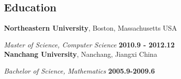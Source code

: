 \documentclass[margin,line]{res}
\begin{document}
\begin{resume}
\section{\sc Education}
{\bf Northeastern University}, Boston, Massachusetts USA

\vspace{-.3cm}
{\em Master of Science, Computer Science} \hfill {\bf 2010.9 - 2012.12}\\

{\bf Nanchang University}, Nanchang, Jiangxi China

\vspace{-.3cm}
{\em Bachelor of Science, Mathematics} \hfill {\bf 2005.9-2009.6}\\


\end{resume}
\end{document}
